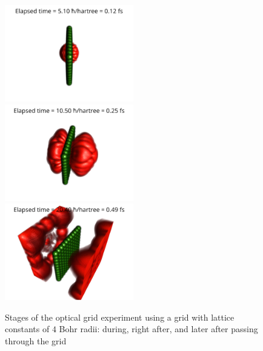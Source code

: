 \begin{figure}
	\begin{center}
		\includegraphics[width=0.5\textwidth]{figures/optical_grid_01.png}
		\includegraphics[width=0.5\textwidth]{figures/optical_grid_02.png}
		\includegraphics[width=0.5\textwidth]{figures/optical_grid_03.png}
		\caption{Stages of the optical grid experiment using a grid with lattice constants of $4$ Bohr radii: during, right after, and later after passing through the grid}
		\label{fig:optical_grid_stages}
	\end{center}	
\end{figure}

